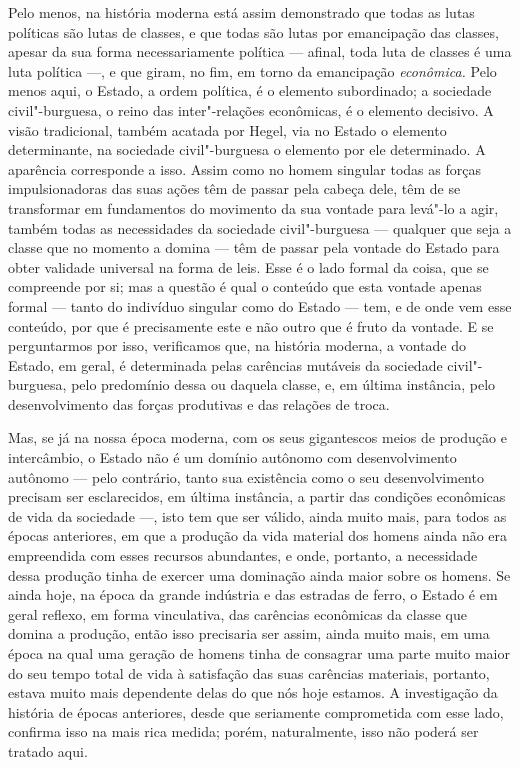 Pelo menos, na história moderna está assim demonstrado que todas as %
lutas políticas são lutas de classes, e que todas são lutas por
emancipação das classes, apesar da sua forma necessariamente política ---
afinal, toda luta de classes é uma luta política ---, e que giram, no fim, em
torno da emancipação \emph{econômica. }Pelo menos aqui, o Estado, a
ordem política, é o elemento subordinado; a sociedade civil"-burguesa, o
reino das inter"-relações econômicas, é o elemento decisivo. A visão
tradicional, também acatada por Hegel, via no Estado o elemento
determinante, na sociedade civil"-burguesa o elemento por ele
determinado. A aparência corresponde a isso. Assim como no homem
singular todas as forças impulsionadoras das suas ações têm de passar
pela cabeça dele, têm de se transformar em fundamentos do movimento da
sua vontade para levá"-lo a agir, também todas as necessidades da
sociedade civil"-burguesa --- qualquer que seja a classe que no momento
a domina --- têm de passar pela vontade do Estado para obter validade
universal na forma de leis. Esse é o lado formal da coisa, que se
compreende por si; mas a questão é qual o conteúdo que esta vontade
apenas formal --- tanto do indivíduo singular como do Estado --- tem, e de
onde vem esse conteúdo, por que é precisamente este e não outro que é
fruto da vontade. E se perguntarmos por isso, verificamos que, na
história moderna, a vontade do Estado, em geral, é determinada pelas
carências mutáveis da sociedade civil"-burguesa, pelo predomínio dessa ou
daquela classe, e, em última instância, pelo desenvolvimento das forças
produtivas e das relações de troca.

Mas, se já na nossa época moderna, com os seus gigantescos meios de
produção e intercâmbio, o Estado não é um domínio autônomo com
desenvolvimento autônomo --- pelo contrário, tanto sua existência como o
seu desenvolvimento precisam ser esclarecidos, em última instância, a
partir das condições econômicas de vida da sociedade ---, isto tem que ser
válido, ainda muito mais, para todos as épocas anteriores, em que a
produção da vida material dos homens ainda não era empreendida com esses
recursos abundantes, e onde, portanto, a necessidade dessa produção tinha
de exercer uma dominação ainda maior sobre os homens. Se ainda
hoje, na época da grande indústria e das estradas de ferro, o Estado é em geral
reflexo, em forma vinculativa, das carências 
econômicas da classe que domina a produção, então isso precisaria ser
assim, ainda muito mais, em uma época na qual uma geração de homens
tinha de consagrar uma parte muito maior do seu tempo total de vida à
satisfação das suas carências materiais, portanto, estava muito mais %
dependente delas do que nós hoje estamos. A investigação da história de
épocas anteriores, desde que seriamente comprometida com esse lado,
confirma isso na mais rica medida; porém, naturalmente, isso não poderá
ser tratado aqui.

